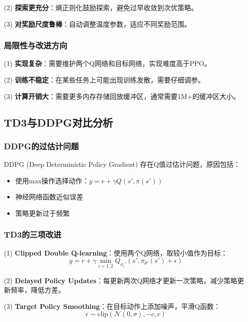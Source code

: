 \documentclass[12pt,a4paper]{ctexart}
\begin{document}
(2) \textbf{探索更充分}：熵正则化鼓励探索，避免过早收敛到次优策略。

(3) \textbf{对奖励尺度鲁棒}：自动调整温度参数，适应不同奖励范围。

\subsubsection{局限性与改进方向}

(1) \textbf{实现复杂}：需要维护两个Q网络和目标网络，实现难度高于PPO。

(2) \textbf{训练不稳定}：在某些任务上可能出现训练发散，需要仔细调参。

(3) \textbf{计算开销大}：需要更多内存存储回放缓冲区，通常需要1M+的缓冲区大小。

\subsection{TD3与DDPG对比分析}

\subsubsection{DDPG的过估计问题}

DDPG (Deep Deterministic Policy Gradient) 存在Q值过估计问题，原因包括：
\begin{itemize}
    \item 使用max操作选择动作：$y = r + \gamma Q(s', \pi(s'))$
    \item 神经网络函数近似误差
    \item 策略更新过于频繁
\end{itemize}

\subsubsection{TD3的三项改进}

(1) \textbf{Clipped Double Q-learning}：使用两个Q网络，取较小值作为目标：
\begin{equation}
y = r + \gamma \min_{i=1,2} Q_{\phi_i'}(s', \pi_{\theta'}(s') + \epsilon)
\end{equation}

(2) \textbf{Delayed Policy Updates}：每更新两次Q网络才更新一次策略，减少策略更新频率，降低方差。

(3) \textbf{Target Policy Smoothing}：在目标动作上添加噪声，平滑Q函数：
\begin{equation}
\epsilon \sim \text{clip}(\mathcal{N}(0, \sigma), -c, c)
\end{equation}
\end{document}
